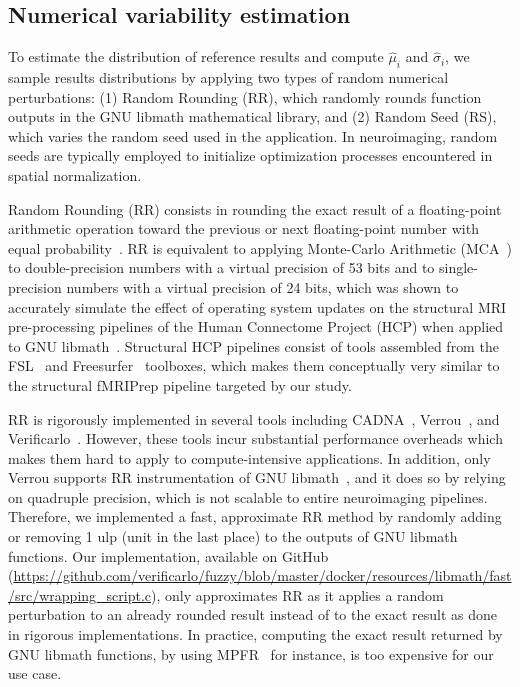 \documentclass[lettersize,journal]{IEEEtran}
\begin{document}
\subsection{Numerical variability estimation}

To estimate the distribution of reference results and compute $\hat \mu_i$ and $\hat \sigma_i$, we sample results distributions by applying two types of random numerical perturbations: (1) Random Rounding (RR), which randomly rounds function outputs in the GNU libmath mathematical library, and (2) Random Seed (RS), which varies the random seed used in the application. In neuroimaging, random seeds are typically employed to initialize optimization processes encountered in spatial normalization.

Random Rounding (RR) consists in rounding the exact result of a floating-point arithmetic operation toward the previous or next floating-point number with equal probability~\cite{forsythe1959reprint}. RR is equivalent to applying Monte-Carlo Arithmetic (MCA~\cite{parker1997monte}) to double-precision numbers with a virtual precision of 53 bits and to single-precision numbers with a virtual precision of 24 bits, which was shown to accurately simulate the effect of operating system updates on the structural MRI pre-processing pipelines of the Human Connectome Project (HCP) when applied to GNU libmath~\cite{salari2021accurate}. Structural HCP pipelines consist of tools assembled from the FSL~\cite{jenkinson2012fsl} and Freesurfer~\cite{fischl2012freesurfer} toolboxes, which makes them conceptually very similar to the structural fMRIPrep pipeline targeted by our study.

RR is rigorously implemented in several tools including CADNA~\cite{jezequel2008cadna}, Verrou~\cite{fevotte2016verrou}, and Verificarlo~\cite{denis2016verificarlo}. However, these tools incur substantial performance overheads which makes them hard to apply to compute-intensive applications. In addition, only Verrou supports RR instrumentation of GNU libmath~\cite{fevotte2019debugging}, and it does so by relying on quadruple precision, which is not scalable to entire neuroimaging pipelines. Therefore, we implemented a fast, approximate RR method by randomly adding or removing 1 ulp (unit in the last place) to the outputs of GNU libmath functions. Our implementation, available on GitHub (\url{https://github.com/verificarlo/fuzzy/blob/master/docker/resources/libmath/fast/src/wrapping\_script.c}),  only approximates RR as it applies a random perturbation to an already rounded result instead of to the exact result as done in rigorous implementations. In practice, computing the exact result returned by GNU libmath functions, by using MPFR~\cite{fousse2007mpfr} for instance, is too expensive for our use case.
\end{document}
